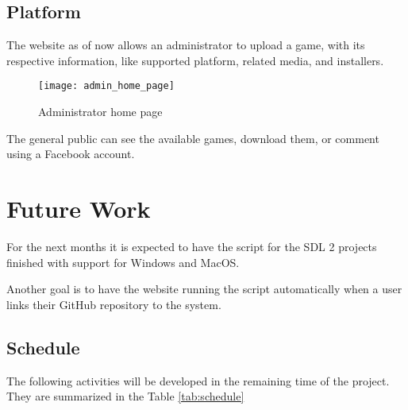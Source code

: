 \subsection[Platform]{Platform}

The website as of now allows an administrator to upload a game, with its respective information, like supported platform, related media, and installers.


\begin{figure}[!ht]
\centering
\texttt{[image: admin\_home\_page]}
\caption{Administrator home page}
\label{fig:admin_home}
\end{figure}


The general public can see the available games, download them, or comment using a Facebook account.


\section[Future Work]{Future Work}

For the next months it is expected to have the script for the SDL 2 projects finished with support for Windows and MacOS.

Another goal is to have the website running the script automatically when a user links their GitHub repository to the system.


\subsection[Schedule]{Schedule}

The following activities will be developed in the remaining time of the project. They are summarized in the Table \ref{tab:schedule}

